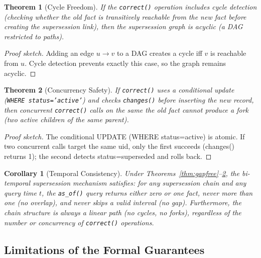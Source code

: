 \documentclass{article}
\newtheorem{theorem}{Theorem}
\newtheorem{corollary}{Corollary}
\begin{document}
\begin{theorem}[Cycle Freedom]
\label{thm:cyclefree}
If the \texttt{correct()} operation includes cycle detection (checking whether the old fact is transitively reachable from the new fact before creating the supersession link), then the supersession graph is acyclic (a DAG restricted to paths).
\end{theorem}

\begin{proof}[Proof sketch]
Adding an edge $u \to v$ to a DAG creates a cycle iff $v$ is reachable from $u$. Cycle detection prevents exactly this case, so the graph remains acyclic.
\end{proof}

\begin{theorem}[Concurrency Safety]
\label{theorem:concurrency}
If \texttt{correct()} uses a conditional update (\texttt{WHERE status='active'}) and checks \texttt{changes()} before inserting the new record, then concurrent \texttt{correct()} calls on the same the old fact cannot produce a fork (two active children of the same parent).
\end{theorem}

\begin{proof}[Proof sketch]
The conditional UPDATE (WHERE status=active) is atomic. If two concurrent calls target the same uid, only the first succeeds (changes() returns 1); the second detects status=superseded and rolls back.
\end{proof}

\begin{corollary}[Temporal Consistency]
\label{cor:consistency}
Under Theorems~\ref{thm:gapfree}--\ref{theorem:concurrency}, the bi-temporal supersession mechanism satisfies: for any supersession chain and any query time $t$, the \texttt{as\_of()} query returns either zero or one fact, never more than one (no overlap), and never skips a valid interval (no gap). Furthermore, the chain structure is always a linear path (no cycles, no forks), regardless of the number or concurrency of \texttt{correct()} operations.
\end{corollary}

\subsection{Limitations of the Formal Guarantees}
\end{document}
